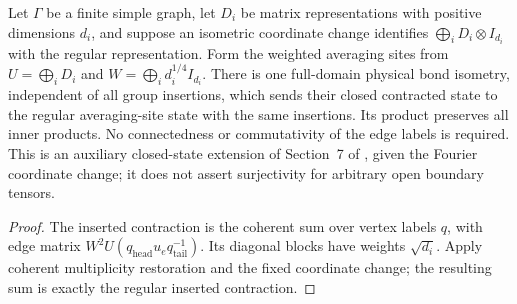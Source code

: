 \begin{lemma}
    \label{thm:peps_graph_inserted_semiregular_equivalence}
    \leanok
    Let $\Gamma$ be a finite simple graph, let $D_i$ be matrix
    representations with positive dimensions $d_i$, and suppose an
    isometric coordinate change identifies
    $\bigoplus_i D_i\otimes I_{d_i}$ with the regular representation.
    Form the weighted averaging sites from
    $U=\bigoplus_i D_i$ and
    $W=\bigoplus_i d_i^{1/4}I_{d_i}$.
    There is one full-domain physical bond isometry, independent of all
    group insertions, which sends their closed contracted state
    to the regular averaging-site state with the same insertions.
    Its product preserves all inner products. No connectedness or
    commutativity of the edge labels is required.
    This is an auxiliary closed-state extension of Section~7 of
    \cite{Schuch2010PEPS}, given the Fourier coordinate change; it does
    not assert surjectivity for arbitrary open boundary tensors.
\end{lemma}
\begin{proof}\leanok
    The inserted contraction is the coherent sum over vertex labels
    $q$, with edge matrix $W^2U(q_{\mathrm{head}}u_eq_{\mathrm{tail}}^{-1})$.
    Its diagonal blocks have weights $\sqrt{d_i}$. Apply coherent
    multiplicity restoration and the fixed coordinate change; the resulting
    sum is exactly the regular inserted contraction.
\end{proof}
